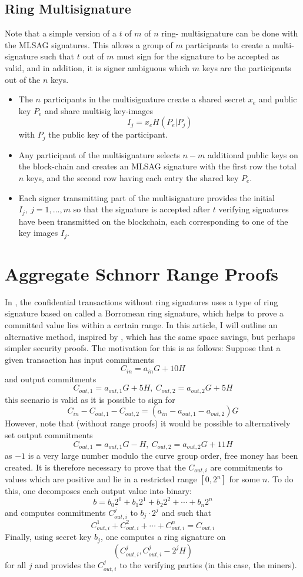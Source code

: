 \documentclass[12pt,oneside,english]{amsart}
\numberwithin{equation}{section}
\numberwithin{figure}{section}
\theoremstyle{plain}
\theoremstyle{plain}
\theoremstyle{remark}
\theoremstyle{plain}
\theoremstyle{remark}
\theoremstyle{remark}
\theoremstyle{plain}
\theoremstyle{definition}
\begin{document}
\subsection{Ring Multisignature}
Note that a simple version of a $t$ of $m$ of $n$ ring- multisignature can be done with the MLSAG signatures. This allows a group of $m$ participants to create a multi-signature such that $t$ out of $m$ must sign for the signature to be accepted as valid, and in addition, it is signer ambiguous which $m$ keys are the participants out of the $n$ keys. 
\begin{itemize}
 \item The $n$ participants in the multisignature create a shared secret $x_e$ and public key $P_e$ and share multisig key-images 
 \[
I_j = x_e H(P_e | P_j)
 \]
 with $P_j$ the public key of the participant. 
 \item Any participant of the multisignature selects $n-m$ additional public keys on the block-chain and creates an MLSAG signature with the first row the total $n$ keys, and the second row having each entry the shared key $P_e$. 
 \item Each signer transmitting part of the multisignature provides the initial $I_j,\ j=1,...,m$ so that the signature is accepted after $t$ verifying signatures have been transmitted on the blockchain, each corresponding to one of the key images $I_j$. 
\end{itemize}

\section{Aggregate Schnorr Range Proofs}
\label{AgSchnorr}
In \cite{GM}, the confidential transactions without ring signatures uses a type of ring signature based on \cite{abe} called a Borromean ring signature, which helps to prove a committed value lies within a certain range. In this article, I will outline an alternative method, inspired by \cite{herranz}, which has the same space savings, but perhaps simpler security proofs. The motivation for this is as follows: Suppose that a given transaction has input commitments
\[
 C_{in} = a_{in} G + 10 H
\]
and output commitments
\[
 C_{out,1} = a_{out,1} G + 5 H,\ C_{out,2} = a_{out,2} G + 5 H
\]
this scenario is valid as it is possible to sign for 
\[
 C_{in} - C_{out,1} - C_{out,2} = \left(a_{in} - a_{out,1} - a_{out,2} \right) G
\]
However, note that (without range proofs) it would be possible to alternatively set output commitments
\[ 
  C_{out,1} = a_{out,1} G - H,\ C_{out,2} = a_{out,2} G + 11 H
\]
as $-1$ is a very large number modulo the curve group order, free money has been created. It is therefore necessary to prove that the $C_{out,i}$ are commitments to values which are positive and lie in a restricted range $[0,2^n]$ for some $n$.
To do this, one decomposes each output value into binary:
\[
 b = b_0 2^0 + b_1 2^1 + b_2 2^2 + \cdots + b_n 2^n
\]
and computes commitments $C_{out,i}^j$ to $b_j \cdot 2^j $ and such that 
\[
 C_{out,i}^1 + C_{out,i}^2 + \cdots + C_{out,i}^n = C_{out,i}
\]
Finally, using secret key $b_j$, one computes a ring signature on 
\[
 (C_{out,i}^j, C_{out,i}^j - 2^j H)
\]
for all $j$ and provides the $C_{out,i}^j$ to the verifying parties (in this case, the miners). 
\end{document}

